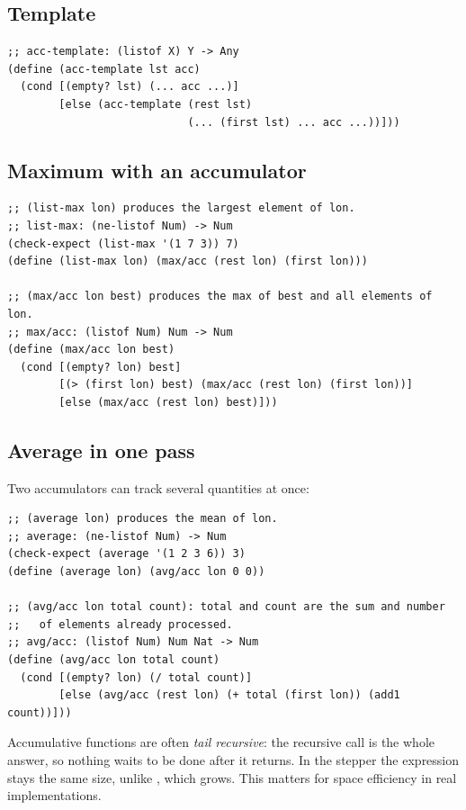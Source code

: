 \subsection{Template}
\begin{lstlisting}[style=racket]
;; acc-template: (listof X) Y -> Any
(define (acc-template lst acc)
  (cond [(empty? lst) (... acc ...)]
        [else (acc-template (rest lst)
                            (... (first lst) ... acc ...))]))
\end{lstlisting}

\subsection{Maximum with an accumulator}
\begin{lstlisting}[style=racket]
;; (list-max lon) produces the largest element of lon.
;; list-max: (ne-listof Num) -> Num
(check-expect (list-max '(1 7 3)) 7)
(define (list-max lon) (max/acc (rest lon) (first lon)))

;; (max/acc lon best) produces the max of best and all elements of lon.
;; max/acc: (listof Num) Num -> Num
(define (max/acc lon best)
  (cond [(empty? lon) best]
        [(> (first lon) best) (max/acc (rest lon) (first lon))]
        [else (max/acc (rest lon) best)]))
\end{lstlisting}

\subsection{Average in one pass}
Two accumulators can track several quantities at once:
\begin{lstlisting}[style=racket]
;; (average lon) produces the mean of lon.
;; average: (ne-listof Num) -> Num
(check-expect (average '(1 2 3 6)) 3)
(define (average lon) (avg/acc lon 0 0))

;; (avg/acc lon total count): total and count are the sum and number
;;   of elements already processed.
;; avg/acc: (listof Num) Num Nat -> Num
(define (avg/acc lon total count)
  (cond [(empty? lon) (/ total count)]
        [else (avg/acc (rest lon) (+ total (first lon)) (add1 count))]))
\end{lstlisting}

\begin{aside}
Accumulative functions are often \emph{tail recursive}: the recursive call is
the whole answer, so nothing waits to be done after it returns. In the stepper
the expression stays the same size, unlike , which
grows. This matters for space efficiency in real implementations.
\end{aside}

